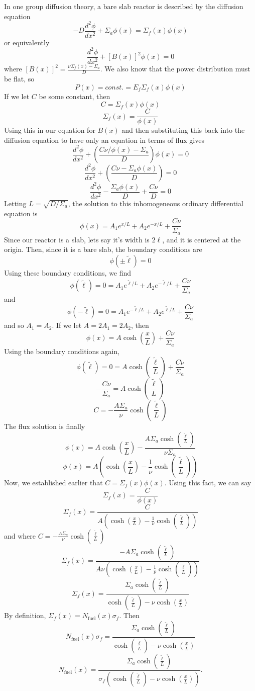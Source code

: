 \documentclass{article}
\newcommand{\Xs}{\Sigma}
\newcommand{\xs}{\sigma}
\begin{document}
In one group diffusion theory, a bare slab reactor is described by the diffusion equation
$$ -D \frac{d^2\phi}{dx^2} + \Xs_a \phi(x) = \Xs_f(x) \phi(x) $$
or equivalently
$$ \frac{d^2\phi}{dx^2} + [B(x)]^2\phi(x) = 0 $$
where $[B(x)]^2 = \frac{\nu\Xs_f(x) - \Xs_a}{D}$. 
We also know that the power distribution must be flat, so
$$ P(x) = const. = E_f \Xs_f(x) \phi(x) $$
If we let $C$ be some constant, then
$$ C = \Xs_f(x)\phi(x) $$
$$ \Xs_f(x) = \frac{C}{\phi(x)} $$
Using this in our equation for $B(x)$ and then substituting this back into the diffusion equation to have only an equation in terms of flux gives
$$ \frac{d^2\phi}{dx^2} + \left(\frac{C\nu/\phi(x) - \Xs_a}{D}\right)\phi(x) = 0 $$
$$ \frac{d^2\phi}{dx^2} + \left(\frac{C\nu - \Xs_a\phi(x)}{D}\right) = 0 $$
$$ \frac{d^2\phi}{dx^2} - \frac{\Xs_a\phi(x)}{D} + \frac{C\nu}{D} = 0 $$
Letting $L = \sqrt{D/\Xs_a}$, the solution to this inhomogeneous ordinary differential equation is
$$ \phi(x) = A_1 e^{x/L} + A_2 e^{-x/L} + \frac{C\nu}{\Xs_a} $$
Since our reactor is a slab, lets say it's width is $2\ell$, and it is centered at the origin. Then, since it is a bare slab, the boundary conditions are
$$ \phi(\pm\tilde{\ell}) = 0 $$
Using these boundary conditions, we find
$$ \phi(\tilde{\ell}) = 0 = A_1 e^{\tilde{\ell}/L} + A_2 e^{-\tilde{\ell}/L} + \frac{C\nu}{\Xs_a} $$
and 
$$ \phi(-\tilde{\ell}) = 0 = A_1 e^{-\tilde{\ell}/L} + A_2 e^{\tilde{\ell}/L} + \frac{C\nu}{\Xs_a} $$
and so $A_1 = A_2$. If we let $A = 2A_1 = 2A_2$, then
$$ \phi(x) = A \cosh\left(\frac{x}{L}\right) + \frac{C\nu}{\Xs_a} $$
Using the boundary conditions again,
$$ \phi(\tilde{\ell}) = 0 = A \cosh\left(\frac{\tilde{\ell}}{L}\right) + \frac{C\nu}{\Xs_a} $$
$$ -\frac{C\nu}{\Xs_a} = A \cosh\left(\frac{\tilde{\ell}}{L}\right) $$
$$ C = -\frac{A\Xs_a}{\nu}\cosh\left(\frac{\tilde{\ell}}{L}\right) $$
The flux solution is finally 
$$ \phi(x) = A \cosh\left(\frac{x}{L}\right) - \frac{A \Xs_a\cosh\left(\frac{\tilde{\ell}}{L}\right)}{\nu\Xs_a} $$
$$ \phi(x) = A \left(\cosh\left(\frac{x}{L}\right) - \frac{1}{\nu}\cosh\left(\frac{\tilde{\ell}}{L}\right)\right) $$
Now, we established earlier that $C = \Xs_f(x) \phi(x)$. Using this fact, we can say
$$ \Xs_f(x) = \frac{C}{\phi(x)} $$
$$ \Xs_f(x) = \frac{C}{A \left(\cosh\left(\frac{x}{L}\right) - \frac{1}{\nu}\cosh\left(\frac{\tilde{\ell}}{L}\right)\right)} $$
and where $ C = -\frac{A\Xs_a}{\nu}\cosh\left(\frac{\tilde{\ell}}{L}\right) $
$$ \Xs_f(x) = \frac{- A \Xs_a\cosh\left(\frac{\tilde{\ell}}{L}\right)}{A\nu \left(\cosh\left(\frac{x}{L}\right) - \frac{1}{\nu}\cosh\left(\frac{\tilde{\ell}}{L}\right)\right)} $$
$$ \Xs_f(x) = \frac{\Xs_a\cosh\left(\frac{\tilde{\ell}}{L}\right)}{\cosh\left(\frac{\tilde{\ell}}{L}\right) - \nu\cosh\left(\frac{x}{L}\right)} $$
By definition, $\Xs_f(x) = N_{\text{fuel}}(x)\xs_f$. Then
$$ N_{\text{fuel}}(x)\xs_f = \frac{\Xs_a\cosh\left(\frac{\tilde{\ell}}{L}\right)}{\cosh\left(\frac{\tilde{\ell}}{L}\right) - \nu\cosh\left(\frac{x}{L}\right)} $$
$$\boxed{ N_{\text{fuel}}(x) = \frac{\Xs_a\cosh\left(\frac{\tilde{\ell}}{L}\right)}{\xs_f \left( \cosh\left(\frac{\tilde{\ell}}{L}\right) - \nu\cosh\left(\frac{x}{L}\right)\right)} }.$$
\end{document}
